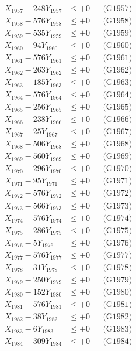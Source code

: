\documentclass[a4paper,10pt]{article}
\begin{document}
{\begin{align}
X_{1957} - 248Y_{1957} &\leq +0 && \text{(G1957)} \\
X_{1958} - 576Y_{1958} &\leq +0 && \text{(G1958)} \\
X_{1959} - 535Y_{1959} &\leq +0 && \text{(G1959)} \\
X_{1960} - 94Y_{1960} &\leq +0 && \text{(G1960)} \\
\allowbreak
X_{1961} - 576Y_{1961} &\leq +0 && \text{(G1961)} \\
X_{1962} - 263Y_{1962} &\leq +0 && \text{(G1962)} \\
X_{1963} - 185Y_{1963} &\leq +0 && \text{(G1963)} \\
X_{1964} - 576Y_{1964} &\leq +0 && \text{(G1964)} \\
X_{1965} - 256Y_{1965} &\leq +0 && \text{(G1965)} \\
X_{1966} - 238Y_{1966} &\leq +0 && \text{(G1966)} \\
X_{1967} - 25Y_{1967} &\leq +0 && \text{(G1967)} \\
X_{1968} - 506Y_{1968} &\leq +0 && \text{(G1968)} \\
X_{1969} - 560Y_{1969} &\leq +0 && \text{(G1969)} \\
X_{1970} - 296Y_{1970} &\leq +0 && \text{(G1970)} \\
\allowbreak
X_{1971} - 95Y_{1971} &\leq +0 && \text{(G1971)} \\
X_{1972} - 576Y_{1972} &\leq +0 && \text{(G1972)} \\
X_{1973} - 566Y_{1973} &\leq +0 && \text{(G1973)} \\
X_{1974} - 576Y_{1974} &\leq +0 && \text{(G1974)} \\
X_{1975} - 286Y_{1975} &\leq +0 && \text{(G1975)} \\
X_{1976} - 5Y_{1976} &\leq +0 && \text{(G1976)} \\
X_{1977} - 576Y_{1977} &\leq +0 && \text{(G1977)} \\
X_{1978} - 31Y_{1978} &\leq +0 && \text{(G1978)} \\
X_{1979} - 250Y_{1979} &\leq +0 && \text{(G1979)} \\
X_{1980} - 152Y_{1980} &\leq +0 && \text{(G1980)} \\
\allowbreak
X_{1981} - 576Y_{1981} &\leq +0 && \text{(G1981)} \\
X_{1982} - 38Y_{1982} &\leq +0 && \text{(G1982)} \\
X_{1983} - 6Y_{1983} &\leq +0 && \text{(G1983)} \\
X_{1984} - 309Y_{1984} &\leq +0 && \text{(G1984)} \\

\end{align}}
\end{document}
